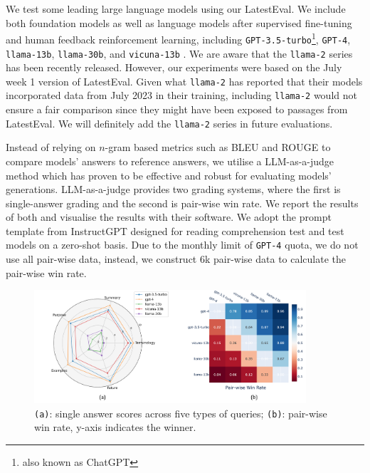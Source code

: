 \documentclass[letterpaper]{article} %
\begin{document}
We test some leading large language models using our LatestEval. We include both foundation models as well as language models after supervised fine-tuning and human feedback reinforcement learning, including \texttt{GPT-3.5-turbo}\footnote{also known as ChatGPT}, \texttt{GPT-4}, \texttt{llama-13b}, \texttt{llama-30b}, and \texttt{vicuna-13b} \cite{vicuna2023}. We are aware that the \texttt{llama-2} series has been recently released. However, our experiments were based on the July week 1 version of LatestEval. Given what \texttt{llama-2} has reported that their models incorporated data from July 2023 in their training, including \texttt{llama-2} would not ensure a fair comparison since they might have been exposed to passages from LatestEval. We will definitely add the \texttt{llama-2} series in future evaluations.

Instead of relying on $n$-gram based metrics such as BLEU and ROUGE to compare models' answers to reference answers, we utilise a LLM-as-a-judge method \cite{zheng2023judging} which has proven to be effective and robust for evaluating models' generations. LLM-as-a-judge provides two grading systems, where the first is single-answer grading and the second is pair-wise win rate. We report the results of both and visualise the results with their software. We adopt the prompt template from InstructGPT \cite{ouyang2022training} designed for reading comprehension test and test models on a zero-shot basis.
Due to the monthly limit of \texttt{GPT-4} quota, we do not use all pair-wise data, instead, we construct 6k pair-wise data to calculate the pair-wise win rate.

\begin{figure}
    \centering
    \includegraphics[width=0.9\textwidth]{performance3.png}
    \caption{\texttt{(a)}: single answer scores across five types of queries; \texttt{(b)}: pair-wise win rate, y-axis indicates the winner. }
    \label{fig:performance}
\end{figure}
\end{document}
